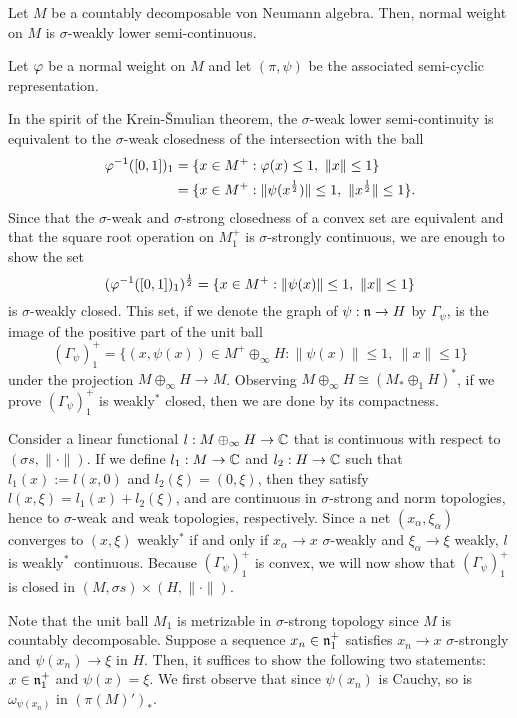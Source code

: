 \documentclass{../../small}
\begin{document}
\begin{thm}
Let $M$ be a countably decomposable von Neumann algebra.
Then,  normal weight on $M$ is $\sigma$-weakly lower semi-continuous.
\end{thm}
\begin{pf}
Let $\varphi$ be a normal weight on $M$ and let $(\pi,\psi)$ be the associated semi-cyclic representation.

In the spirit of the Krein-\v Smulian theorem, the $\sigma$-weak lower semi-continuity is equivalent to the $\sigma$-weak closedness of the intersection with the ball
\begin{align*}
\varphi^{-1}([0,1])_1
&=\{x\in M^+:\varphi(x)\le1,\ \|x\|\le1\}\\
&=\{x\in M^+:\|\psi(x^{\frac12})\|\le1,\ \|x^{\frac12}\|\le1\}.
\end{align*}
Since that the $\sigma$-weak and $\sigma$-strong closedness of a convex set are equivalent and that the square root operation on $M^+_1$ is $\sigma$-strongly continuous, we are enough to show the set
\[(\varphi^{-1}([0,1])_1)^{\frac12}=\{x\in M^+:\|\psi(x)\|\le1,\ \|x\|\le1\}\]
is $\sigma$-weakly closed.
This set, if we denote the graph of $\psi:\mathfrak{n}\to H$ by $\Gamma_\psi$, is the image of the positive part of the unit ball
\[(\Gamma_\psi)^+_1=\{(x,\psi(x))\in M^+\oplus_\infty H:\|\psi(x)\|\le1,\ \|x\|\le1\}\]
under the projection $M\oplus_\infty H\to M$.
Observing $M\oplus_\infty H\cong(M_*\oplus_1H)^*$, if we prove $(\Gamma_\psi)_1^+$ is weakly$^*$ closed, then we are done by its compactness.

Consider a linear functional $l:M\oplus_\infty H\to\mathbb{C}$ that is continuous with respect to $(\sigma s,\|\cdot\|)$.
If we define $l_1:M\to\mathbb{C}$ and $l_2:H\to\mathbb{C}$ such that $l_1(x):=l(x,0)$ and $l_2(\xi)=(0,\xi)$, then they satisfy $l(x,\xi)=l_1(x)+l_2(\xi)$, and are continuous in $\sigma$-strong and norm topologies, hence to $\sigma$-weak and weak topologies, respectively.
Since a net $(x_\alpha,\xi_\alpha)$ converges to $(x,\xi)$ weakly$^*$ if and only if $x_\alpha\to x$ $\sigma$-weakly and $\xi_\alpha\to\xi$ weakly, $l$ is weakly$^*$ continuous.
Because $(\Gamma_\psi)_1^+$ is convex, we will now show that $(\Gamma_\psi)^+_1$ is closed in $(M,\sigma s)\times(H,\|\cdot\|)$.

Note that the unit ball $M_1$ is metrizable in $\sigma$-strong topology since $M$ is countably decomposable.
Suppose a sequence $x_n\in\mathfrak{n}^+_1$ satisfies $x_n\to x$ $\sigma$-strongly and $\psi(x_n)\to\xi$ in $H$.
Then, it suffices to show the following two statements: $x\in\mathfrak{n}^+_1$ and $\psi(x)=\xi$.
We first observe that since $\psi(x_n)$ is Cauchy, so is $\omega_{\psi(x_n)}$ in $(\pi(M)')_*$.


\end{pf}
\end{document}
